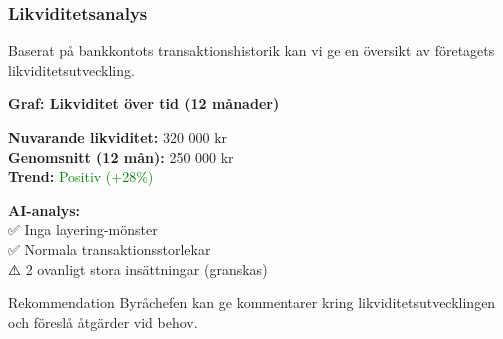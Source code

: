 \documentclass[10pt]{beamer}
\begin{document}

\begin{frame}[label=likviditet]
  \frametitle{Likviditetsanalys}
  \small
  Baserat på bankkontots transaktionshistorik kan vi ge en översikt av företagets likviditetsutveckling.
  
  \vspace{0.5cm}
  \begin{center}
    \textbf{Graf: Likviditet över tid (12 månader)}\\
    \vspace{0.3cm}
  \end{center}
  
  \vspace{0.5cm}
  \begin{minipage}{0.48\textwidth}
    \textbf{Nuvarande likviditet:} 320 000 kr\\
    \textbf{Genomsnitt (12 mån):} 250 000 kr\\
    \textbf{Trend:} \textcolor{green}{Positiv (+28\%)}
  \end{minipage}
  \hfill
  \begin{minipage}{0.48\textwidth}
    \textbf{AI-analys:}\\
    \footnotesize
    ✅ Inga layering-mönster\\
    ✅ Normala transaktionsstorlekar\\
    ⚠️ 2 ovanligt stora insättningar (granskas)
  \end{minipage}
  
  \vspace{0.5cm}
  \begin{block}{Rekommendation}
    Byråchefen kan ge kommentarer kring likviditetsutvecklingen och föreslå åtgärder vid behov.
  \end{block}
  
  \vspace{0.5cm}
  \begin{flushright}
    \hyperlink{nextslide}{}
  \end{flushright}
\end{frame}
\end{document}
